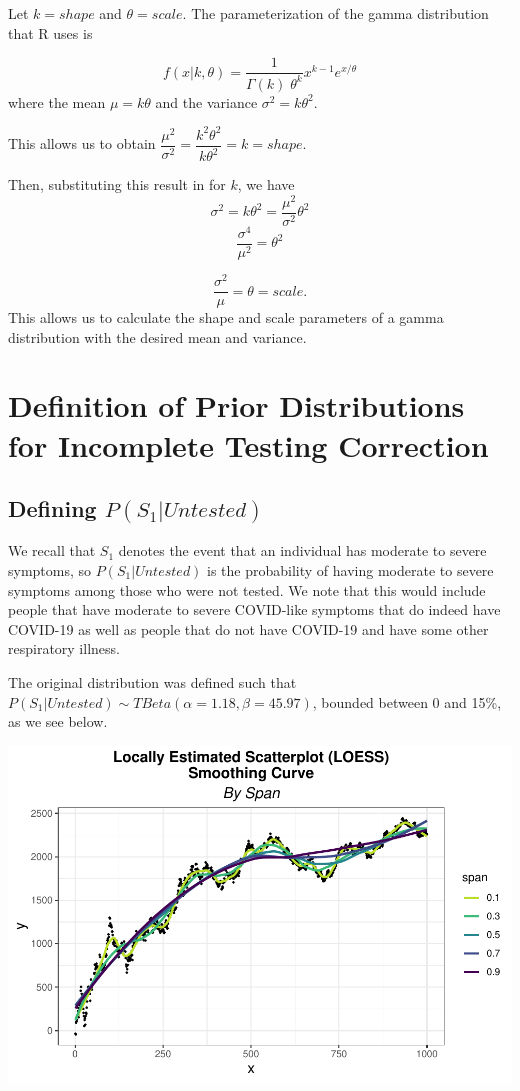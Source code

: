 \documentclass[12pt,twoside]{smiththesis}
\begin{document}
Let \(k=shape\) and \(\theta=scale\). The parameterization of the gamma distribution that R uses is

\[f(x|k,\theta) = \frac{1}{\Gamma(k) \;\theta^k}x^{k-1} e^{x/\theta}\]
where the mean \(\mu =k\theta\) and the variance \(\sigma^2 = k\theta^2\).

This allows us to obtain \(\dfrac{\mu^2}{\sigma^2} = \dfrac{k^2 \theta^2}{k\theta^2} = k =shape\).

Then, substituting this result in for \(k\), we have \[\sigma^2 = k \theta^2 = \dfrac{\mu^2}{\sigma^2} \theta^2\]
\[\frac{\sigma^4}{\mu^2}=\theta^2\]

\[\frac{\sigma^2}{\mu}=\theta = scale.\]
This allows us to calculate the shape and scale parameters of a gamma distribution with the desired mean and variance.

\hypertarget{definition-of-prior-distributions-for-incomplete-testing-correction}{%
\section{Definition of Prior Distributions for Incomplete Testing Correction}\label{definition-of-prior-distributions-for-incomplete-testing-correction}}

\hypertarget{defining-ps_1untested}{%
\subsection{\texorpdfstring{Defining \(P(S_1|Untested)\)}{Defining P(S\_1\textbar Untested)}}\label{defining-ps_1untested}}

We recall that \(S_1\) denotes the event that an individual has moderate to severe symptoms, so
\(P(S_1|Untested)\) is the probability of having moderate to severe symptoms among those who were not tested. We note that this would include people that have moderate to severe COVID-like symptoms that do indeed have COVID-19 as well as people that do not have COVID-19 and have some other respiratory illness.

The original distribution was defined such that \(P(S_1|Untested) \sim TBeta(\alpha = 1.18, \beta = 45.97)\), bounded between 0 and 15\%, as we see below.

\includegraphics[width=0.8\linewidth]{thesis_files/figure-latex/unnamed-chunk-30-1}
\end{document}
